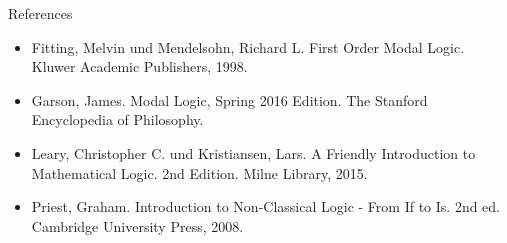 \documentclass[12pt]{beamer}
\begin{document}
\begin{frame}{References}
  
  \begin{itemize}
  \item Fitting, Melvin und Mendelsohn, Richard L. First Order Modal
    Logic. Kluwer Academic Publishers, 1998.
  \item Garson, James. Modal Logic, Spring 2016 Edition. The Stanford
    Encyclopedia of Philosophy.
  \item Leary, Christopher C. und Kristiansen, Lars. A Friendly
    Introduction to Mathematical Logic. 2nd Edition. Milne Library,
    2015.
  \item Priest, Graham. Introduction to Non-Classical Logic - From If
    to Is. 2nd ed. Cambridge University Press, 2008.

  \end{itemize}

\end{frame}
\end{document}
